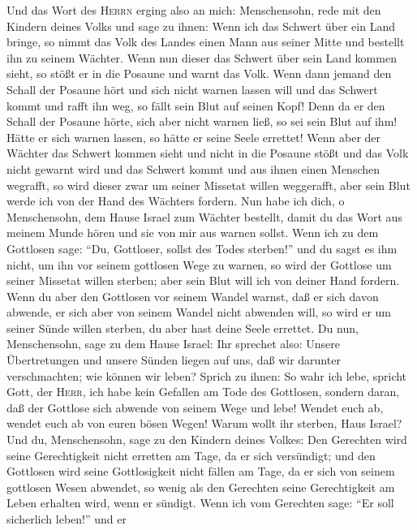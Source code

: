  Und das Wort des \textsc{Herrn} erging also an mich:
 Menschensohn, rede mit den Kindern deines Volks und sage
zu ihnen: Wenn ich das Schwert über ein Land bringe, so nimmt das Volk
des Landes einen Mann aus seiner Mitte und bestellt ihn zu seinem
Wächter.  Wenn nun dieser das Schwert über sein Land
kommen sieht, so stößt er in die Posaune und warnt das Volk.
 Wenn dann jemand den Schall der Posaune hört und sich
nicht warnen lassen will und das Schwert kommt und rafft ihn weg, so
fällt sein Blut auf seinen Kopf!  Denn da er den Schall
der Posaune hörte, sich aber nicht warnen ließ, so sei sein Blut auf
ihm! Hätte er sich warnen lassen, so hätte er seine Seele errettet!
 Wenn aber der Wächter das Schwert kommen sieht und nicht
in die Posaune stößt und das Volk nicht gewarnt wird und das Schwert
kommt und aus ihnen einen Menschen wegrafft, so wird dieser zwar um
seiner Missetat willen weggerafft, aber sein Blut werde ich von der Hand
des Wächters fordern.  Nun habe ich dich, o Menschensohn,
dem Hause Israel zum Wächter bestellt, damit du das Wort aus meinem
Munde hören und sie von mir aus warnen sollst.  Wenn ich
zu dem Gottlosen sage: ``Du, Gottloser, sollst des Todes sterben!'' und
du sagst es ihm nicht, um ihn vor seinem gottlosen Wege zu warnen, so
wird der Gottlose um seiner Missetat willen sterben; aber sein Blut will
ich von deiner Hand fordern.  Wenn du aber den Gottlosen
vor seinem Wandel warnst, daß er sich davon abwende, er sich aber von
seinem Wandel nicht abwenden will, so wird er um seiner Sünde willen
sterben, du aber hast deine Seele errettet.  Du nun,
Menschensohn, sage zu dem Hause Israel: Ihr sprechet also: Unsere
Übertretungen und unsere Sünden liegen auf uns, daß wir darunter
verschmachten; wie können wir leben?  Sprich zu ihnen: So
wahr ich lebe, spricht Gott, der \textsc{Herr}, ich habe kein Gefallen
am Tode des Gottlosen, sondern daran, daß der Gottlose sich abwende von
seinem Wege und lebe! Wendet euch ab, wendet euch ab von euren bösen
Wegen! Warum wollt ihr sterben, Haus Israel?  Und du,
Menschensohn, sage zu den Kindern deines Volkes: Den Gerechten wird
seine Gerechtigkeit nicht erretten am Tage, da er sich versündigt; und
den Gottlosen wird seine Gottlosigkeit nicht fällen am Tage, da er sich
von seinem gottlosen Wesen abwendet, so wenig als den Gerechten seine
Gerechtigkeit am Leben erhalten wird, wenn er sündigt. 
Wenn ich vom Gerechten sage: ``Er soll sicherlich leben!'' und er
